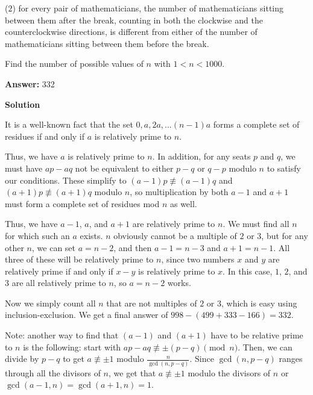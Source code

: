\begin{enumerate}
\begin{itemize}
            \end{itemize}
            
            \begin{itemize}
($2$) for every pair of mathematicians, the number of mathematicians sitting between them after the break, counting in both the clockwise and the counterclockwise directions, is different from either of the number of mathematicians sitting between them before the break.

            \end{itemize}
            Find the number of possible values of $n$ with $1 < n < 1000.$

 \textbf{Answer: }332



\textbf{Solution}

It is a well-known fact that the set $0, a, 2a, ... (n-1)a$ forms a complete set of residues if and only if $a$ is relatively prime to $n$.

 Thus, we have $a$ is relatively prime to $n$. In addition, for any seats $p$ and $q$, we must have $ap - aq$ not be equivalent to either $p - q$ or $q - p$ modulo $n$ to satisfy our conditions. These simplify to $(a-1)p \not\equiv (a-1)q$ and $(a+1)p \not\equiv (a+1)q$ modulo $n$, so multiplication by both $a-1$ and $a+1$ must form a complete set of residues mod $n$ as well. 

 Thus, we have $a-1$, $a$, and $a+1$ are relatively prime to $n$. We must find all $n$ for which such an $a$ exists. $n$ obviously cannot be a multiple of $2$ or $3$, but for any other $n$, we can set $a = n-2$, and then $a-1 = n-3$ and $a+1 = n-1$. All three of these will be relatively prime to $n$, since two numbers $x$ and $y$ are relatively prime if and only if $x-y$ is relatively prime to $x$. In this case, $1$, $2$, and $3$ are all relatively prime to $n$, so $a = n-2$ works.

 Now we simply count all $n$ that are not multiples of $2$ or $3$, which is easy using inclusion-exclusion. We get a final answer of $998 - (499 + 333 - 166) = \boxed{332}$.

 
Note: another way to find that $(a-1)$ and $(a+1)$ have to be relative prime to $n$ is the following: start with $ap-aq \not \equiv \pm(p-q) \pmod n$. Then, we can divide by $p-q$ to get $a \not \equiv \pm 1$ modulo $\frac{n}{\gcd(n, p-q)}$. Since $\gcd(n, p-q)$ ranges through all the divisors of $n$, we get that $a \not \equiv \pm 1$ modulo the divisors of $n$ or $\gcd(a-1, n) = \gcd(a+1, n) = 1$.


\end{enumerate}
